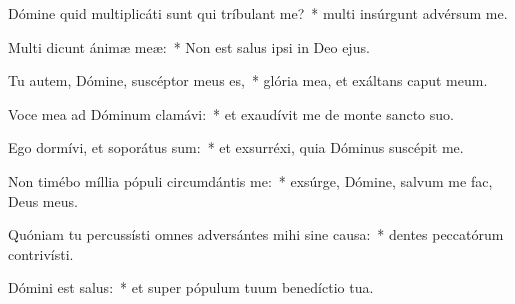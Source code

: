 \item Dómine quid multiplicáti sunt qui tríbulant me?~* multi insúrgunt advérsum me.

\item Multi dicunt ánimæ meæ:~* Non est salus ipsi in Deo ejus.

\item Tu autem, Dómine, suscéptor meus es,~* glória mea, et exáltans caput meum.

\item Voce mea ad Dóminum clamávi:~* et exaudívit me de monte sancto suo.

\item Ego dormívi, et soporátus sum:~* et exsurréxi, quia Dóminus suscépit me.

\item Non timébo míllia pópuli circumdántis me:~* exsúrge, Dómine, salvum me fac, Deus meus.

\item Quóniam tu percussísti omnes adversántes mihi sine causa:~* dentes peccatórum contrivísti.

\item Dómini est salus:~* et super pópulum tuum benedíctio tua.
